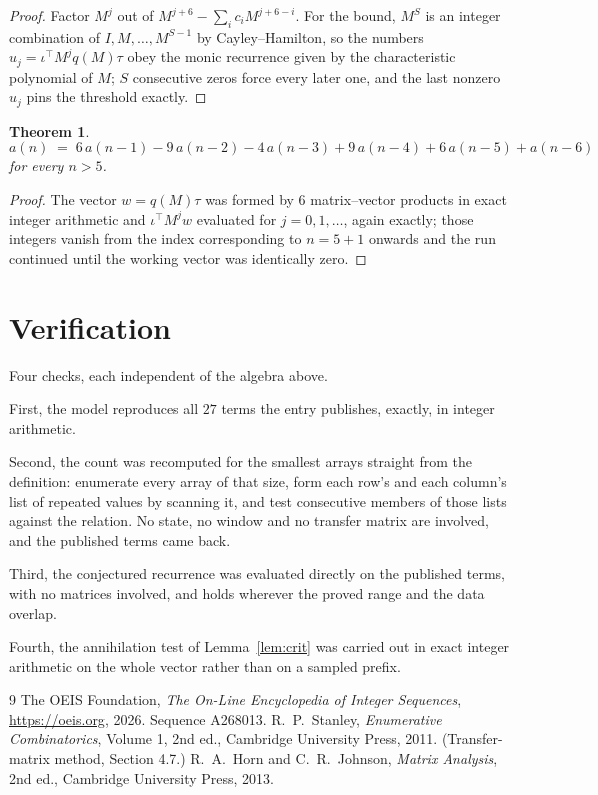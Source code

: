 \documentclass[11pt,a4paper]{article}
\theoremstyle{plain}
\newtheorem{theorem}{Theorem}
\theoremstyle{definition}
\begin{document}
\begin{proof}
Factor $M^{j}$ out of $M^{j+6}-\sum_ic_iM^{j+6-i}$. For the bound, $M^{S}$
is an integer combination of $I,M,\dots,M^{S-1}$ by Cayley--Hamilton, so the numbers
$u_j=\iota^{\!\top}M^{j}q(M)\tau$ obey the monic recurrence given by the characteristic
polynomial of $M$; $S$ consecutive zeros force every later one, and the last nonzero $u_j$
pins the threshold exactly.
\end{proof}

\begin{theorem}
\[
a(n)\;=\;6\,a(n-1) - 9\,a(n-2) - 4\,a(n-3) + 9\,a(n-4) + 6\,a(n-5) + a(n-6)
\]
for every $n>5$.
\end{theorem}

\begin{proof}
The vector $w=q(M)\tau$ was formed by $6$ matrix--vector products in exact integer
arithmetic and $\iota^{\!\top}M^{j}w$ evaluated for $j=0,1,\dots$, again exactly; those
integers vanish from the index corresponding to $n=5+1$ onwards and the run continued
until the working vector was identically zero.
\end{proof}

\section{Verification}

Four checks, each independent of the algebra above.

First, the model reproduces all $27$ terms the entry publishes, exactly, in integer
arithmetic.

Second, the count was recomputed for the smallest arrays straight from the definition:
enumerate every array of that size, form each row's and each column's list of repeated values
by scanning it, and test consecutive members of those lists against the relation. No state, no
window and no transfer matrix are involved, and the published terms came back.

Third, the conjectured recurrence was evaluated directly on the published terms, with no
matrices involved, and holds wherever the proved range and the data overlap.

Fourth, the annihilation test of Lemma~\ref{lem:crit} was carried out in exact integer
arithmetic on the whole vector rather than on a sampled prefix.

\begin{thebibliography}{9}
 The OEIS Foundation, \emph{The On-Line Encyclopedia of Integer
Sequences}, \url{https://oeis.org}, 2026. Sequence A268013.
 R.~P.~Stanley, \emph{Enumerative Combinatorics}, Volume 1, 2nd ed.,
Cambridge University Press, 2011. (Transfer-matrix method, Section 4.7.)
 R.~A.~Horn and C.~R.~Johnson, \emph{Matrix Analysis}, 2nd ed., Cambridge
University Press, 2013.
\end{thebibliography}
\end{document}
